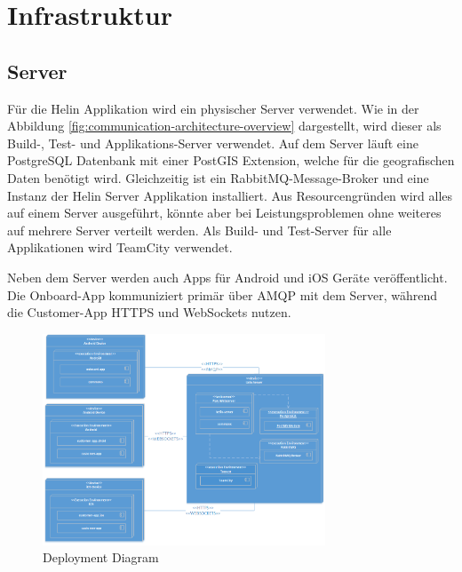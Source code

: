 \newpage

\chapter{Infrastruktur}

\section{Server}

Für die Helin Applikation wird ein physischer Server verwendet. Wie in der Abbildung \ref{fig:communication-architecture-overview} dargestellt, wird dieser als Build-, Test- und Applikations-Server verwendet. 
Auf dem Server läuft eine PostgreSQL Datenbank mit einer PostGIS Extension, welche für die geografischen Daten benötigt wird. Gleichzeitig ist ein RabbitMQ-Message-Broker und eine Instanz der Helin Server Applikation installiert. Aus Resourcengründen wird alles auf einem Server ausgeführt, könnte aber bei Leistungsproblemen ohne weiteres auf mehrere Server verteilt werden. Als Build- und Test-Server für alle Applikationen wird TeamCity verwendet. 

Neben dem Server werden auch Apps für Android und iOS Geräte veröffentlicht. Die Onboard-App kommuniziert primär über AMQP mit dem Server, während die Customer-App HTTPS und WebSockets nutzen.

\begin{figure}[h]
	\centering
	\includegraphics[width=0.75\textwidth]{images/DeploymentDiagram.png}
	\caption{Deployment Diagram}
	\label{fig:deployment-diagram}
\end{figure}


